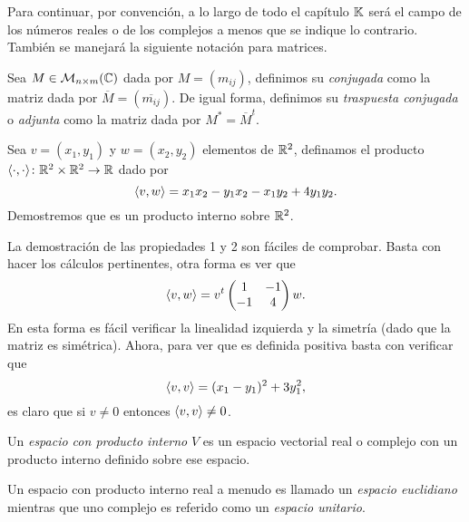 Para continuar, por convención, a lo largo de todo el capítulo $\mathbb{K}$ será el campo de los números reales o de los complejos a menos que se indique lo contrario. También se manejará la siguiente notación para matrices.

\begin{defi}
  Sea $M \in \mathcal{M}_{n\times m}(\mathbb{C})$ dada por $M = (m_{ij})$, definimos su \emph{conjugada} como la matriz dada por $\overline{M} = (\overline{m_{ij}})$. De igual forma, definimos su \emph{traspuesta conjugada} o \emph{adjunta} como la matriz dada por $M^* = \overline{M}^t$.
\end{defi}

\begin{example}
  Sea $v = (x_1, y_1)$ y $w = (x_2, y_2)$ elementos de $\mathbb{R}^2$, definamos el producto $\langle\cdot,\cdot\rangle\colon \mathbb{R}^2 \times \mathbb{R}^2 \to \mathbb{R}$ dado por
    \[ \langle v,w\rangle = x_1 x_2 - y_1x_2 - x_1y_2 + 4y_1y_2. \]
  Demostremos que es un producto interno sobre $\mathbb{R}^2$.

  \examplesolution

  La demostración de las propiedades 1 y 2 son fáciles de comprobar. Basta con hacer los cálculos pertinentes, otra forma es ver que 
    \[
      \langle v,w\rangle = v^t \begin{pmatrix}
        1 & -1 \\ -1 & 4
      \end{pmatrix} w.
    \]
  En esta forma es fácil verificar la linealidad izquierda y la simetría (dado que la matriz es simétrica). Ahora, para ver que es definida positiva basta con verificar que
   \[
     \langle v,v\rangle = (x_1 - y_1)^2 + 3 y_1^2,
   \]
   es claro que si $v \neq 0$ entonces $\langle v,v\rangle \neq 0$.
\end{example}

\begin{defi}
  Un \emph{espacio con producto interno} $V$ es un espacio vectorial real o complejo con un producto interno definido sobre ese espacio.
\end{defi}

Un espacio con producto interno real a menudo es llamado un \emph{espacio euclidiano} mientras que uno complejo es referido como un \emph{espacio unitario}.